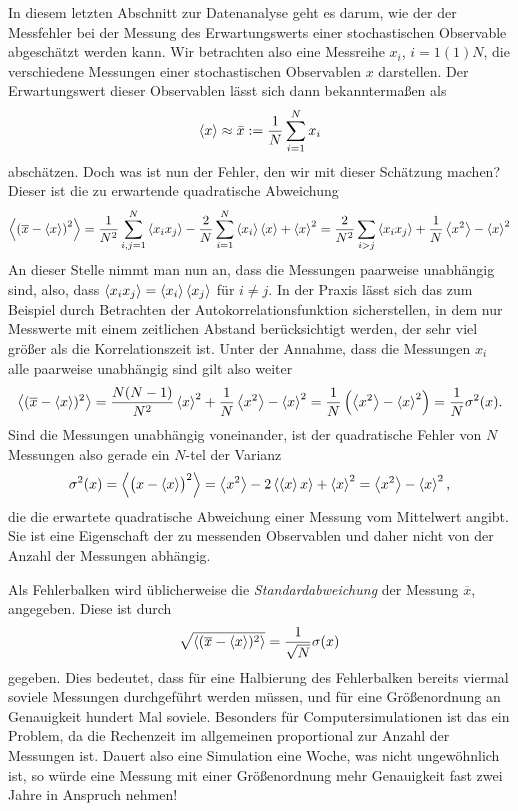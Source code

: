 In diesem letzten Abschnitt zur Datenanalyse geht es darum, wie der
der Messfehler bei der Messung des Erwartungswerts einer
stochastischen Observable abgeschätzt werden kann. Wir betrachten also
eine Messreihe $x_i$, $i=1(1)N$, die verschiedene Messungen einer
stochastischen Observablen $x$ darstellen. Der Erwartungswert dieser
Observablen lässt sich dann bekanntermaßen als
\begin{equation}
  \label{eq:mean}
  \left\langle{x}\right\rangle \approx \bar{x} := \frac{1}{N}\sum_{i=1}^N x_i
\end{equation}
abschätzen. Doch was ist nun der Fehler, den wir mit dieser Schätzung
machen? Dieser ist die zu erwartende quadratische Abweichung
\begin{equation}
  \left\langle{\left(\overline{x} - \left\langle{x}\right\rangle\right)^2}\right\rangle =
  \frac{1}{N^2}\sum_{i,j=1}^N \left\langle{x_ix_j}\right\rangle -
  \frac{2}{N}\sum_{i=1}^N \left\langle{x_i}\right\rangle\left\langle{x}\right\rangle + \left\langle{x}\right\rangle^2
  = \frac{2}{N^2}\sum_{i > j} \left\langle{x_ix_j}\right\rangle
  + \frac{1}{N}\left\langle{x^2}\right\rangle - \left\langle{x}\right\rangle^2
\end{equation}
An dieser Stelle nimmt man nun an, dass die Messungen paarweise
unabhängig sind, also, dass $\left\langle{x_ix_j}\right\rangle = \left\langle{x_i}\right\rangle\left\langle{x_j}\right\rangle$ für
$i\neq j$.  In der Praxis lässt sich das zum Beispiel durch Betrachten
der Autokorrelationsfunktion sicherstellen, in dem nur Messwerte mit
einem zeitlichen Abstand berücksichtigt werden, der sehr viel größer
als die Korrelationszeit ist. Unter der Annahme, dass die Messungen
$x_i$ alle paarweise unabhängig sind gilt also weiter
\begin{equation}
  \label{eq:esterr}
  \left\langle{(\overline{x} - \left\langle{x}\right\rangle)^2}\right\rangle
  = \frac{N(N-1)}{N^2}\left\langle{x}\right\rangle^2 + \frac{1}{N}\left\langle{x^2}\right\rangle - \left\langle{x}\right\rangle^2
  = \frac{1}{N}\left(\left\langle{x^2}\right\rangle - \left\langle{x}\right\rangle^2\right)
  = \frac{1}{N}\sigma^2(x).
\end{equation}
Sind die Messungen unabhängig voneinander, ist der quadratische Fehler
von $N$ Messungen also gerade ein $N$-tel der Varianz
\begin{equation}
  \sigma^2(x) = \left\langle{\bigl(x-\left\langle{x}\right\rangle\bigr)^2}\right\rangle
  = \left\langle{x^2}\right\rangle - 2\left\langle{\left\langle{x}\right\rangle x}\right\rangle  + \left\langle{x}\right\rangle^2
  = \left\langle{x^2}\right\rangle - \left\langle{x}\right\rangle^2,
\end{equation}
die die erwartete quadratische Abweichung einer Messung vom Mittelwert
angibt. Sie ist eine Eigenschaft der zu messenden Observablen und daher
nicht von der Anzahl der Messungen abhängig.

Als Fehlerbalken wird üblicherweise die \emph{Standardabweichung} der
Messung $\overline{x}$, angegeben. Diese ist durch
\begin{equation}
  \sqrt{\left\langle{(\overline{x} - \left\langle{x}\right\rangle)^2}\right\rangle}
  = \frac{1}{\sqrt{N}}\sigma(x)
\end{equation}
gegeben. Dies bedeutet, dass für eine Halbierung des Fehlerbalken
bereits viermal soviele Messungen durchgeführt werden müssen, und für
eine Größenordnung an Genauigkeit hundert Mal soviele. Besonders für
Computersimulationen ist das ein Problem, da die Rechenzeit im
allgemeinen proportional zur Anzahl der Messungen ist. Dauert also
eine Simulation eine Woche, was nicht ungewöhnlich ist, so würde eine
Messung mit einer Größenordnung mehr Genauigkeit fast zwei Jahre in
Anspruch nehmen!

